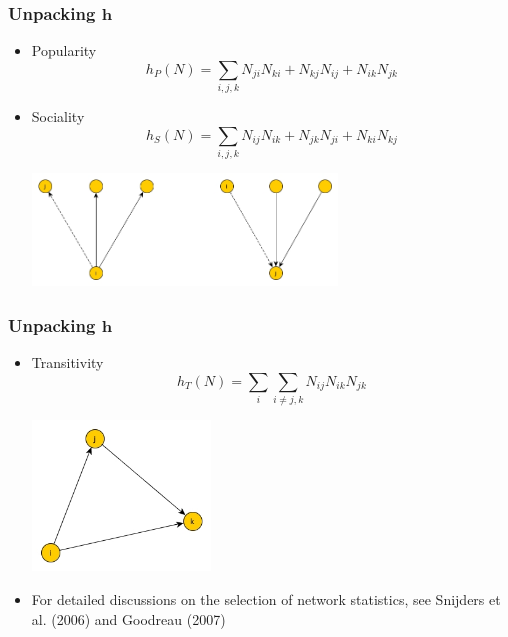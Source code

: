 \documentclass[handout]{beamer}
\newcommand{\bh}{\bm{h}}
\begin{document}
\begin{frame}
\frametitle{Unpacking $\bh$}
\begin{itemize}
\item Popularity
\[
h_P(N) = \sum_{i,j,k} N_{ji}N_{ki}+N_{kj}N_{ij}+N_{ik}N_{jk}
\]
\item Sociality
\[
h_S(N) = \sum_{i,j,k} N_{ij}N_{ik}+N_{jk}N_{ji}+N_{ki}N_{kj}
\]
\begin{center}
\includegraphics[height=3cm]{flow.jpg}
\end{center}
\end{itemize}
\end{frame}

\begin{frame}
\frametitle{Unpacking $\bh$}
\begin{itemize}
\item Transitivity
\[
h_T(N) = \sum_i \sum_{i \neq j,k} N_{ij}N_{ik}N_{jk}
\]
\begin{center}
\includegraphics[height=4cm]{transitivity.jpg}
\end{center}
\item For detailed discussions on the selection of network statistics, see Snijders et al. (2006) and Goodreau (2007)
\end{itemize}
\end{frame}

\end{document}

